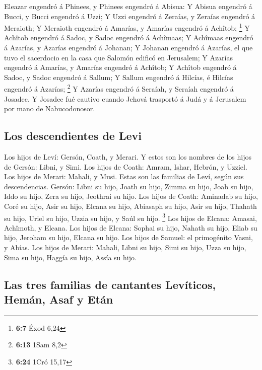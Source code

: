  Eleazar engendró á Phinees, y Phinees engendró á Abisua:
 Y Abisua engendró á Bucci, y Bucci engendró á Uzzi;
 Y Uzzi engendró á Zeraías, y Zeraías engendró á Meraioth;
 Y Meraioth engendró á Amarías, y Amarías engendró á
Achîtob; \footnote{\textbf{6:7} Éxod 6,24}  Y Achîtob
engendró á Sadoc, y Sadoc engendró á Achîmaas;  Y Achîmaas
engendró á Azarías, y Azarías engendró á Johanan;  Y
Johanan engendró á Azarías, el que tuvo el sacerdocio en la casa que
Salomón edificó en Jerusalem;  Y Azarías engendró á
Amarías, y Amarías engendró á Achîtob;  Y Achîtob
engendró á Sadoc, y Sadoc engendró á Sallum;  Y Sallum
engendró á Hilcías, é Hilcías engendró á Azarías; \footnote{\textbf{6:13}
  1Sam 8,2}  Y Azarías engendró á Seraíah, y Seraíah
engendró á Josadec.  Y Josadec fué cautivo cuando Jehová
trasportó á Judá y á Jerusalem por mano de Nabucodonosor.

\hypertarget{los-descendientes-de-levi}{%
\subsection{Los descendientes de Levi}\label{los-descendientes-de-levi}}

 Los hijos de Leví: Gersón, Coath, y Merari.
 Y estos son los nombres de los hijos de Gersón: Libni, y
Simi.  Los hijos de Coath: Amram, Ishar, Hebrón, y
Uzziel.  Los hijos de Merari: Mahali, y Musi. Estas son
las familias de Leví, según sus descendencias.  Gersón:
Libni su hijo, Joath su hijo, Zimma su hijo,  Joab su
hijo, Iddo su hijo, Zera su hijo, Jeothrai su hijo.  Los
hijos de Coath: Aminadab su hijo, Coré su hijo, Asir su hijo,
 Elcana su hijo, Abiasaph su hijo, Asir su hijo,
 Thahath su hijo, Uriel su hijo, Uzzia su hijo, y Saúl su
hijo. \footnote{\textbf{6:24} 1Cró 15,17}  Los hijos de
Elcana: Amasai, Achîmoth, y Elcana.  Los hijos de Elcana:
Sophai su hijo, Nahath su hijo,  Eliab su hijo, Jeroham
su hijo, Elcana su hijo.  Los hijos de Samuel: el
primogénito Vasni, y Abías.  Los hijos de Merari: Mahali,
Libni su hijo, Simi su hijo, Uzza su hijo,  Sima su hijo,
Haggía su hijo, Assía su hijo.

\hypertarget{las-tres-familias-de-cantantes-levuxedticos-hemuxe1n-asaf-y-etuxe1n}{%
\subsection{Las tres familias de cantantes Levíticos, Hemán, Asaf y
Etán}\label{las-tres-familias-de-cantantes-levuxedticos-hemuxe1n-asaf-y-etuxe1n}}

